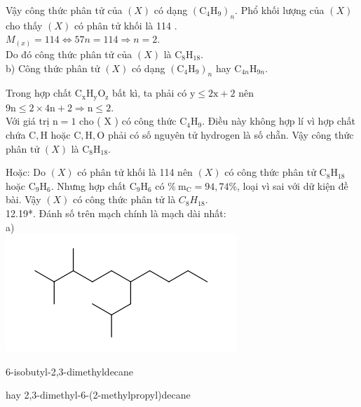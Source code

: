 \documentclass[10pt]{article}
\begin{document}
Vậy công thức phân tử của $(X)$ có dạng $\left(\mathrm{C}_{4} \mathrm{H}_{9}\right)_{n}$. Phổ khối lượng của $(X)$ cho thấy $(X)$ có phân tử khối là 114 .\\
$M_{(x)}=114 \Leftrightarrow 57 n=114 \Rightarrow n=2$.\\
Do đó công thức phân tử của $(X)$ là $\mathrm{C}_{8} \mathrm{H}_{18}$.\\
b) Công thức phân tử $(X)$ có dạng $\left(\mathrm{C}_{4} \mathrm{H}_{9}\right)_{n}$ hay $\mathrm{C}_{4 n} \mathrm{H}_{9 n}$.

Trong hợp chất $\mathrm{C}_{\mathrm{x}} \mathrm{H}_{\mathrm{y}} \mathrm{O}_{\mathrm{z}}$ bất kì, ta phải có $\mathrm{y} \leq 2 \mathrm{x}+2$ nên $9 \mathrm{n} \leq 2 \times 4 \mathrm{n}+2 \Rightarrow \mathrm{n} \leq 2$.\\
Với giá trị $\mathrm{n}=1$ cho ( X ) có công thức $\mathrm{C}_{4} \mathrm{H}_{9}$. Điều này không hợp lí vì hợp chất chứa $\mathrm{C}, \mathrm{H}$ hoặc $\mathrm{C}, \mathrm{H}, \mathrm{O}$ phải có số nguyên tử hydrogen là số chẵn. Vậy công thức phân tử $(X)$ là $\mathrm{C}_{8} \mathrm{H}_{18}$.

Hoặc: Do $(X)$ có phân tử khối là 114 nên $(X)$ có công thức phân tử $\mathrm{C}_{8} \mathrm{H}_{18}$ hoặc $\mathrm{C}_{9} \mathrm{H}_{6}$. Nhưng hợp chất $\mathrm{C}_{9} \mathrm{H}_{6}$ có $\% \mathrm{~m}_{\mathrm{C}}=94,74 \%$, loại vì sai với dữ kiện đề bài. Vậy $(X)$ có công thức phân tử là $C_{8} H_{18}$.\\
12.19*. Đánh số trên mạch chính là mạch dài nhất:\\
a)\\
\includegraphics{smile-c05ff8a8f6a902df806937c71558d014007dd2a0}

6-isobutyl-2,3-dimethyldecane

hay 2,3-dimethyl-6-(2-methylpropyl)decane
\end{document}
